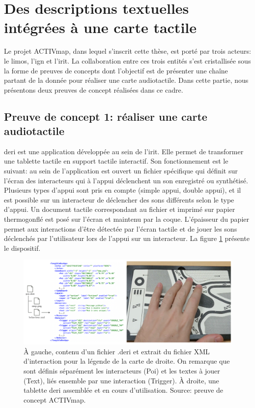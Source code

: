 \section{Des descriptions textuelles intégrées à une carte tactile}

Le projet ACTIVmap, dans lequel s'inscrit cette thèse, est porté par trois acteurs: le \gls{limos}, l'\gls{ign} et l'\gls{irit}. La collaboration entre ces trois entités s'est cristallisée sous la forme de preuves de concepts dont l'objectif est de présenter une chaîne partant de la donnée pour réaliser une carte audiotactile. Dans cette partie, nous présentons deux preuves de concept réalisées dans ce cadre.

\subsection{Preuve de concept 1: réaliser une carte audiotactile}

\label{sec:experimentation_poc1}

\gls{deri} \citep{Brock2012} est une application développée au sein de l'\gls{irit}. Elle permet de transformer une tablette tactile en support tactile interactif. Son fonctionnement est le suivant: au sein de l'application est ouvert un fichier spécifique qui définit sur l'écran des interacteurs qui à l'appui déclenchent un son enregistré ou synthétisé. Plusieurs types d'appui sont pris en compte (simple appui, double appui), et il est possible sur un interacteur de déclencher des sons différents selon le type d'appui. Un document tactile correspondant au fichier et imprimé sur papier thermogonflé est posé sur l'écran et maintenu par la coque. L'épaisseur du papier permet aux interactions d'être détectée par l'écran tactile et de jouer les sons déclenchés par l'utilisateur lors de l'appui sur un interacteur. La figure \ref{fig:experimentation_exemple_deri} présente le dispositif.

\begin{figure}
    \centering
    \includegraphics[width=\textwidth]{images/experimentation/exemple_deri.pdf}
    \caption[Exemple de fichier DERi]{À gauche, contenu d'un fichier .deri et extrait du fichier XML d'interaction pour la légende de la carte de droite. On remarque que sont définis séparément les interacteurs (Poi) et les textes à jouer (Text), liés ensemble par une interaction (Trigger). À droite, une tablette \gls{deri} assemblée et en cours d'utilisation. Source: preuve de concept ACTIVmap.}
    \label{fig:experimentation_exemple_deri}
\end{figure}

